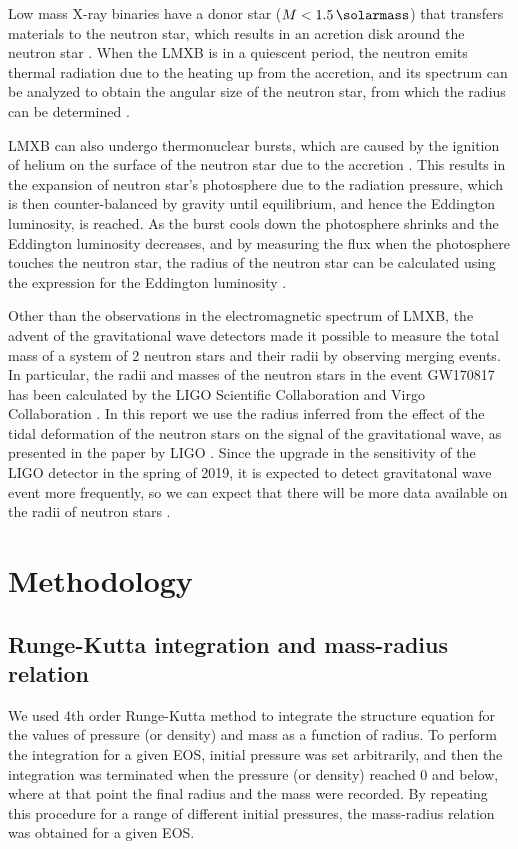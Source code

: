 \documentclass[draft,11pt]{article}
\theoremstyle{definition}
\theoremstyle{remark}
\begin{document}
            Low mass X-ray binaries have a donor star ($M<\SI{1.5}{\solarmass}$) that transfers materials to the neutron star, which results in an acretion disk around the neutron star \parencite{tauris.2003/xray.binary}. When the LMXB is in a quiescent period, the neutron emits thermal radiation due to the heating up from the accretion, and its spectrum can be analyzed to obtain the angular size of the neutron star, from which the radius can be determined \parencite{ozel.psaltis.2016/radius.oberve}.
            
            LMXB can also undergo thermonuclear bursts, which are caused by the ignition of helium on the surface of the neutron star due to the accretion \parencite{ozel.paulo.2016/masses.radii.eos}. This results in the expansion of neutron star's photosphere due to the radiation pressure, which is then counter-balanced by gravity until equilibrium, and hence the Eddington luminosity, is reached. As the burst cools down the photosphere shrinks and the Eddington luminosity decreases, and by measuring the flux when the photosphere touches the neutron star, the radius of the neutron star can be calculated using the expression for the Eddington luminosity \parencite{ozel.psaltis.2016/radius.oberve}.
            
            Other than the observations in the electromagnetic spectrum of LMXB, the advent of the gravitational wave detectors made it possible to measure the total mass of a system of 2 neutron stars and their radii by observing merging events. In particular, the  radii and masses of the neutron stars in the event GW170817 has been calculated by the LIGO Scientific Collaboration and Virgo Collaboration \cite{ligo.virgo.2019/prop.of.ns.merger.GW170817,ligo.virgo.2018/GW170817.ns.radii}. In this report we use the radius inferred from the effect of the tidal deformation of the neutron stars on the signal of the gravitational wave, as presented in the paper by LIGO \cite{ligo.virgo.2018/GW170817.ns.radii}. Since the upgrade in the sensitivity of the LIGO detector in the spring of 2019, it is expected to detect gravitatonal wave event more frequently, so we can expect that there will be more data available on the radii of neutron stars \cite{ligo.update.2019}. %
    
    \section{Methodology}
        \subsection{Runge-Kutta integration and mass-radius relation}
            We used 4th order Runge-Kutta method to integrate the structure equation for the values of pressure (or density) and mass as a function of radius. To perform the integration for a given EOS, initial pressure was set arbitrarily, and then the integration was terminated when the pressure (or density) reached 0 and below, where at that point the final radius and the mass were recorded. By repeating this procedure for a range of different initial pressures, the mass-radius relation was obtained for a given EOS.
            
\end{document}
